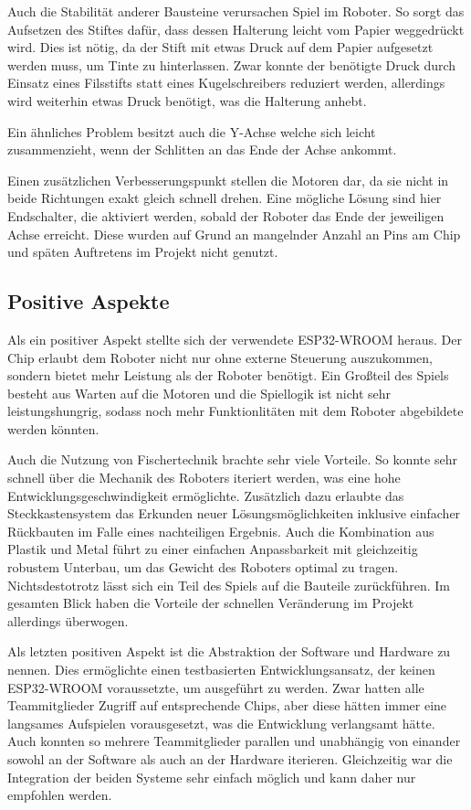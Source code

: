 \documentclass[conference,compsoc,final,a4paper]{IEEEtran}
\begin{document}
Auch die Stabilität anderer Bausteine verursachen Spiel im Roboter. So sorgt das Aufsetzen des Stiftes dafür, dass dessen Halterung
leicht vom Papier weggedrückt wird. Dies ist nötig, da der Stift mit etwas Druck auf dem Papier aufgesetzt werden muss, um
Tinte zu hinterlassen. Zwar konnte der benötigte Druck durch Einsatz eines Filsstifts statt eines Kugelschreibers reduziert werden,
allerdings wird weiterhin etwas Druck benötigt, was die Halterung anhebt.

Ein ähnliches Problem besitzt auch die Y-Achse welche sich leicht zusammenzieht, wenn der Schlitten an das Ende der Achse ankommt.

Einen zusätzlichen Verbesserungspunkt stellen die Motoren dar, da sie nicht in beide Richtungen exakt gleich schnell drehen. Eine
mögliche Lösung sind hier Endschalter, die aktiviert werden, sobald der Roboter das Ende der jeweiligen Achse erreicht. Diese wurden
auf Grund an mangelnder Anzahl an Pins am Chip und späten Auftretens im Projekt nicht genutzt.

\subsection{Positive Aspekte}

Als ein positiver Aspekt stellte sich der verwendete ESP32-WROOM heraus. Der Chip erlaubt dem Roboter nicht nur ohne externe Steuerung
auszukommen, sondern bietet mehr Leistung als der Roboter benötigt. Ein Großteil des Spiels besteht aus Warten auf die Motoren und die
Spiellogik ist nicht sehr leistungshungrig, sodass noch mehr Funktionlitäten mit dem Roboter abgebildete werden könnten.

Auch die Nutzung von Fischertechnik brachte sehr viele Vorteile. So konnte sehr schnell über die Mechanik des Roboters iteriert werden,
was eine hohe Entwicklungsgeschwindigkeit ermöglichte. Zusätzlich dazu erlaubte das Steckkastensystem das Erkunden neuer Lösungsmöglichkeiten
inklusive einfacher Rückbauten im Falle eines nachteiligen Ergebnis. Auch die Kombination aus Plastik und Metal führt zu einer einfachen 
Anpassbarkeit mit gleichzeitig robustem Unterbau, um das Gewicht des Roboters optimal zu tragen. Nichtsdestotrotz lässt sich ein Teil des
Spiels auf die Bauteile zurückführen. Im gesamten Blick haben die Vorteile der schnellen Veränderung im Projekt allerdings überwogen.

Als letzten positiven Aspekt ist die Abstraktion der Software und Hardware zu nennen. Dies ermöglichte einen testbasierten
Entwicklungsansatz, der keinen ESP32-WROOM voraussetzte, um ausgeführt zu werden. Zwar hatten alle Teammitglieder Zugriff auf entsprechende
Chips, aber diese hätten immer eine langsames Aufspielen vorausgesetzt, was die Entwicklung verlangsamt hätte. Auch konnten so mehrere
Teammitglieder parallen und unabhängig von einander sowohl an der Software als auch an der Hardware iterieren. Gleichzeitig war die
Integration der beiden Systeme sehr einfach möglich und kann daher nur empfohlen werden.
\end{document}
